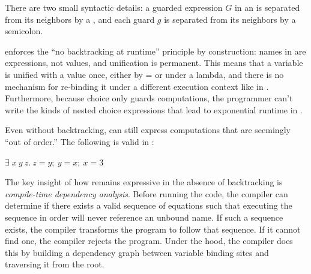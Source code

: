 \documentclass[runningheads]{llncs}
\begin{document}
        There are two small syntactic details: a guarded expression $G$ in an
        \iffibf is separated from its neighbors by a \dbar, and each guard $g$
        is separated from its neighbors by a semicolon. %
        
        \VMinus enforces the ``no backtracking at runtime'' principle by
        construction: names in \VMinus are expressions, not values, and
        unification is permanent. %
        This means that a variable is unified with a
        value once, either by = or under a lambda, and there is no mechanism 
        for re-binding it under a different execution context like in \VC. %
        Furthermore, because choice only guards computations, the programmer can't write the kinds of nested choice 
        expressions that lead to exponential runtime in \VC. %

        Even without backtracking, \VMinus can still express computations that 
        are seemingly ``out of order.'' The following is valid in \VMinus:

        \begin{example} 
          $\exists\; x~y~z.~z = y;~y = x;~x = \mathit{3}$ 
        \end{example}

        The key insight of how \VMinus remains expressive in the absence of
        backtracking is \textit{compile-time dependency analysis}. %
        Before running the code, the compiler can determine if there exists a
        valid sequence of equations such that executing the sequence in order
        will never reference an unbound name. %
        If such a sequence exists, the compiler transforms the program to follow that sequence. %
        If it cannot find one, the compiler rejects the program. %
        Under the hood, the compiler does this by building a dependency graph
        between variable binding sites and traversing it from the root. %
        
\end{document}
